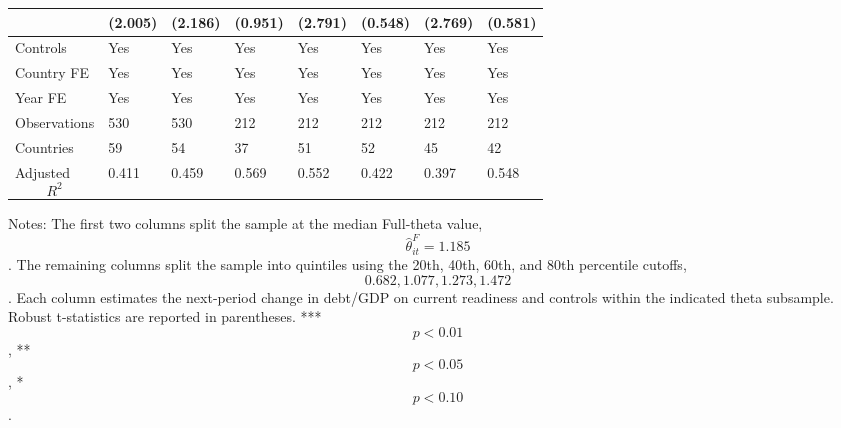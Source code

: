 \begin{table}[H]
\begin{threeparttable}
\begin{tabularx}{\textwidth}{lYYYYYYY}
  & (2.005) & (2.186) & (0.951) & (2.791) & (0.548) & (2.769) & (0.581) \\
\midrule
Controls & Yes & Yes & Yes & Yes & Yes & Yes & Yes \\
Country FE & Yes & Yes & Yes & Yes & Yes & Yes & Yes \\
Year FE & Yes & Yes & Yes & Yes & Yes & Yes & Yes \\
Observations & 530 & 530 & 212 & 212 & 212 & 212 & 212 \\
Countries & 59 & 54 & 37 & 51 & 52 & 45 & 42 \\
Adjusted $$R^2$$ & 0.411 & 0.459 & 0.569 & 0.552 & 0.422 & 0.397 & 0.548 \\
\bottomrule
\end{tabularx}
\begin{tablenotes}[flushleft]\footnotesize
\item Notes: The first two columns split the sample at the median Full-theta value, $$\widehat{\theta}^{F}_{it}=1.185$$. The remaining columns split the sample into quintiles using the 20th, 40th, 60th, and 80th percentile cutoffs, $$0.682, 1.077, 1.273, 1.472$$. Each column estimates the next-period change in debt/GDP on current readiness and controls within the indicated theta subsample. Robust t-statistics are reported in parentheses. *** $$p<0.01$$, ** $$p<0.05$$, * $$p<0.10$$.
\end{tablenotes}
\end{threeparttable}
\end{table}
